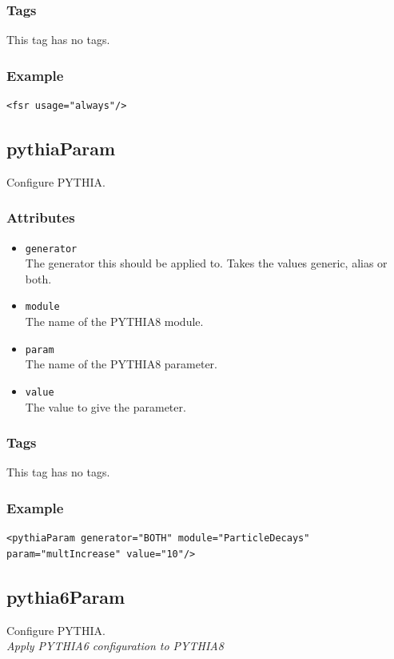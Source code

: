 \subsubsection*{Tags}
This tag has no tags.
\subsubsection*{Example}
{\footnotesize
\begin{verbatim}
<fsr usage="always"/>
\end{verbatim}
}

\subsection{pythiaParam}
Configure PYTHIA.
\subsubsection*{Attributes}
\begin{itemize}
\item{\tt generator}\\
      The generator this should be applied to. Takes the values generic, alias or both.
\item{\tt module}\\
      The name of the PYTHIA8 module.
\item{\tt param}\\
      The name of the PYTHIA8 parameter.
\item{\tt value}\\
      The value to give the parameter.
\end{itemize}
\subsubsection*{Tags}
This tag has no tags.
\subsubsection*{Example}
{\footnotesize
\begin{verbatim}
<pythiaParam generator="BOTH" module="ParticleDecays" param="multIncrease" value="10"/>
\end{verbatim}
}

\subsection{pythia6Param}
Configure PYTHIA.\\
\emph{Apply PYTHIA6 configuration to PYTHIA8}
